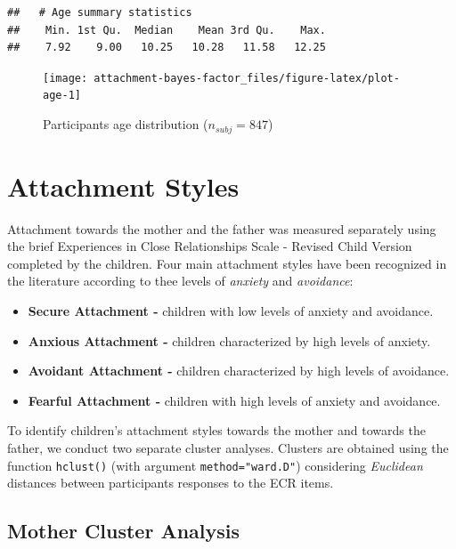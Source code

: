 \documentclass[
]{book}
\providecommand{\tightlist}{%
  \setlength{\itemsep}{0pt}\setlength{\parskip}{0pt}}
\begin{document}
\begin{verbatim}
##   # Age summary statistics
##    Min. 1st Qu.  Median    Mean 3rd Qu.    Max. 
##    7.92    9.00   10.25   10.28   11.58   12.25
\end{verbatim}

\begin{figure}

{\centering \texttt{[image: attachment-bayes-factor\_files/figure-latex/plot-age-1]} 

}

\caption{Participants age distribution ($n_{subj} = 847$)}\label{fig:plot-age}
\end{figure}

\hypertarget{attachment-styles}{%
\section{Attachment Styles}\label{attachment-styles}}

Attachment towards the mother and the father was measured separately using the brief Experiences in Close Relationships Scale - Revised Child Version \citep[ECR-RC,][]{Brenning2014ThePQ, marciBriefExperiencesClose2019} completed by the children. Four main attachment styles have been recognized in the literature according to thee levels of \emph{anxiety} and \emph{avoidance}:

\begin{itemize}
\tightlist
\item
  \textbf{Secure Attachment -} children with low levels of anxiety and avoidance.
\item
  \textbf{Anxious Attachment -} children characterized by high levels of anxiety.
\item
  \textbf{Avoidant Attachment -} children characterized by high levels of avoidance.
\item
  \textbf{Fearful Attachment -} children with high levels of anxiety and avoidance.
\end{itemize}

To identify children's attachment styles towards the mother and towards the father, we conduct two separate cluster analyses. Clusters are obtained using the function \texttt{hclust()} (with argument \texttt{method="ward.D"}) considering \emph{Euclidean} distances between participants responses to the ECR items.

\hypertarget{mother-cluster-analysis}{%
\subsection{Mother Cluster Analysis}\label{mother-cluster-analysis}}
\end{document}
